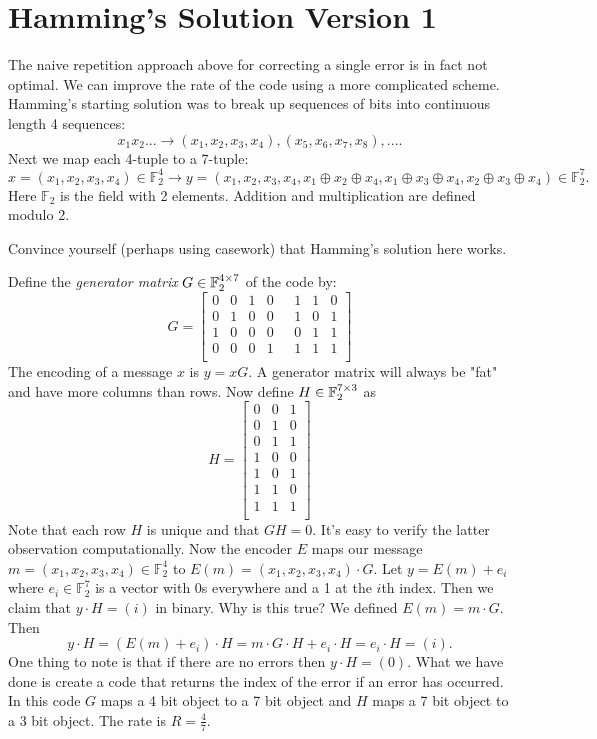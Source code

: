 \documentclass[10pt]{article}
\begin{document}
\section{Hamming's Solution Version 1}
The naive repetition approach above for correcting a single error is in fact not optimal. We can improve the rate of the code using a more complicated scheme. Hamming's starting solution was to break up sequences of bits into continuous length 4 sequences:
$$
x_1 x_2 ... \rightarrow (x_1, x_2, x_3, x_4), (x_5, x_6, x_7, x_8), ... 
.$$
Next we map each 4-tuple to a 7-tuple:
$$
x = (x_1, x_2, x_3, x_4) \in \mathbb F_2^4 \rightarrow y = (x_1, x_2, x_3, x_4, x_1 \oplus x_2 \oplus x_4, x_1 \oplus x_3 \oplus x_4, x_2 \oplus x_3 \oplus x_4) \in \mathbb F_2^7
.$$
Here $\mathbb F_2$ is the field with 2 elements. Addition and multiplication are defined modulo 2.

\begin{exercise}
Convince yourself (perhaps using casework) that Hamming's solution here works.
\end{exercise}

Define the \emph{generator matrix} $G \in {\mathbb F}_2^{4\times7}$ of the code by:
\begin{equation}
G = \left[\begin{array}{ccccccc}
0&0&1&0& \ \ \ 1&1&0 \\
0&1&0&0& \ \ \ 1&0&1 \\
1&0&0&0& \ \ \ 0&1&1 \\
0&0&0&1& \ \ \ 1&1&1 \\
\end{array}\right]
\end{equation}
The encoding of a message $x$ is $y = xG$. A generator matrix will always be "fat" and have more columns than rows. Now define $H\in {\mathbb F}_2^{7\times 3}$ as
\begin{equation}
H = \left[\begin{array}{ccc}
0 & 0 & 1 \\
0 & 1 & 0 \\
0 & 1 & 1 \\
1 & 0 & 0 \\
1 & 0 & 1 \\
1 & 1 & 0 \\
1 & 1 & 1 \\
\end{array}\right]
\end{equation}
Note that each row $H$ is unique and that $GH = 0.$ It's easy to verify the latter observation computationally. Now the encoder $E$ maps our message $m = (x_1, x_2, x_3, x_4) \in \mathbb F_2^4$ to $E(m) = (x_1, x_2, x_3, x_4) \cdot G.$ Let $y = E(m) + e_i$ where $e_i \in \mathbb F_2^7$ is a vector with 0s everywhere and a 1 at the $i$th index. Then we claim that $y \cdot H = (i)$ in binary. Why is this true? 
We defined $E(m) = m \cdot G$. Then $$y \cdot H = (E(m) + e_i) \cdot H = m \cdot G \cdot H + e_i \cdot H = e_i \cdot H = (i).$$ One thing to note is that if there are no errors then $y\cdot H = (0).$ What we have done is create a code that returns the index of the error if an error has occurred. In this code $G$ maps a 4 bit object to a 7 bit object and $H$ maps a 7 bit object to a 3 bit object. The rate is $R = \frac{4}{7}.$ 
\end{document}
